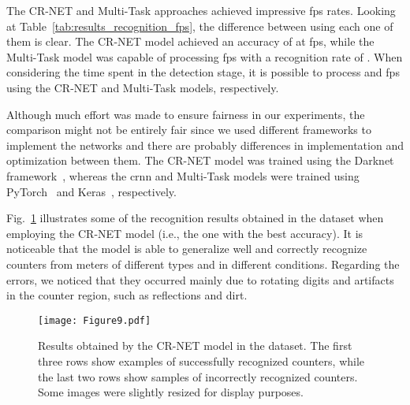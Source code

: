 The CR-NET and Multi-Task approaches achieved impressive \gls*{fps} rates. Looking at Table~\ref{tab:results_recognition_fps}, the difference between using each one of them is clear. The CR-NET model achieved an accuracy of \REV{\%} at  \gls*{fps}, while the Multi-Task model was capable of processing  \gls*{fps} with a recognition rate of \REV{\%}. When considering the time spent in the detection stage, it is possible to process  and  \gls*{fps} using the CR-NET and Multi-Task models, respectively. 

Although much effort was made to ensure fairness in our experiments, the comparison might not be entirely fair since we used different frameworks to implement the networks and there are probably differences in implementation and optimization between them. The CR-NET model was trained using the Darknet framework~\cite{darknet13}, whereas the \gls*{crnn} and Multi-Task models were trained using PyTorch~\cite{paszke2017automatic} and Keras~\cite{chollet2015keras}, respectively.

Fig.~\ref{fig:results_dataset} illustrates some of the recognition results obtained in the \dataset dataset when employing the CR-NET model (i.e., the one with the best accuracy). It is noticeable that the model is able to generalize well and correctly recognize counters from meters of different types and in different conditions. Regarding the errors, we noticed that they occurred mainly due to rotating digits and artifacts in the counter region, such as reflections and dirt.

\begin{figure}[!htb]
	\centering
	\texttt{[image: Figure9.pdf]}
	\vspace{1mm}
	\caption{Results obtained by the CR-NET model in the \dataset dataset. The first three rows show examples of successfully recognized counters, while the last two rows show samples of incorrectly recognized counters. Some images were slightly resized for display purposes.}
	\label{fig:results_dataset}  
	\vspace{-4mm} 
\end{figure}

